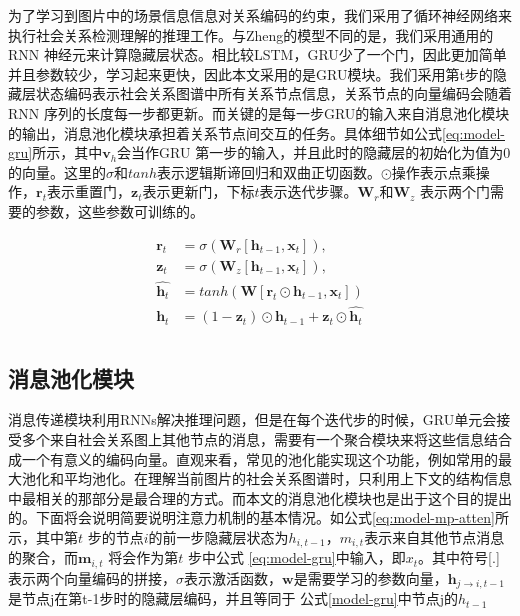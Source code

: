 为了学习到图片中的场景信息信息对关系编码的约束，我们采用了循环神经网络来执行社会关系检测理解的推理工作。与Zheng\cite{zheng2015conditional}的模型不同的是，我们采用通用的RNN 神经元来计算隐藏层状态。相比较LSTM，GRU少了一个门，因此更加简单并且参数较少，学习起来更快，因此本文采用的是GRU模块。我们采用第t步的隐藏层状态编码表示社会关系图谱中所有关系节点信息，关系节点的向量编码会随着RNN 序列的长度每一步都更新。而关键的是每一步GRU的输入来自消息池化模块的输出，消息池化模块承担着关系节点间交互的任务。具体细节如公式\ref{eq:model-gru}所示，其中$\mathbf{v}_h$会当作GRU 第一步的输入，并且此时的隐藏层的初始化为值为0的向量。这里的$\sigma$和$tanh$表示逻辑斯谛回归和双曲正切函数。$\odot$操作表示点乘操作，$\bm{r}_t$表示重置门，$\bm{z}_t$表示更新门，下标$t$表示迭代步骤。$\mathbf{W}_r$和$\mathbf{W}_z$ 表示两个门需要的参数，这些参数可训练的。

\begin{equation} \label{eq:model-gru}
\begin{split}
\bm{r}_t &=  \sigma(\bm{W}_{r}[\bm{h}_{t-1}, \bm{x}_t]), \\
\bm{z}_t &=  \sigma(\bm{W}_{z}[\bm{h}_{t-1}, \bm{x}_t]), \\
\hat{\bm{h}_t} &= tanh(\bm{W}[\bm{r}_t \odot \bm{h}_{t-1}, \bm{x}_{t}])\\
\bm{h}_t &= (1 - \bm{z}_t) \odot \bm{h}_{t - 1} + \bm{z}_t \odot \hat{\bm{h}_t} \\
\end{split}
\end{equation}

\subsection{消息池化模块}

消息传递模块利用RNNs解决推理问题，但是在每个迭代步的时候，GRU单元会接受多个来自社会关系图上其他节点的消息，需要有一个聚合模块来将这些信息结合成一个有意义的编码向量。直观来看，常见的池化能实现这个功能，例如常用的最大池化和平均池化。在理解当前图片的社会关系图谱时，只利用上下文的结构信息中最相关的那部分是最合理的方式。而本文的消息池化模块也是出于这个目的提出的。下面将会说明简要说明注意力机制的基本情况。如公式\ref{eq:model-mp-atten}所示，其中第$t$ 步的节点$i$的前一步隐藏层状态为$h_{i,t-1}$，$m_{i,t}$表示来自其他节点消息的聚合，而$\bm{m}_{i,t}$ 将会作为第$t$ 步中公式
\ref{eq:model-gru}中输入，即$x_{t}$。其中符号[.]表示两个向量编码的拼接，$\sigma$表示激活函数，$\bm{w}$是需要学习的参数向量，$\bm{h}_{j \to i,t-1}$是节点j在第t-1步时的隐藏层编码，并且等同于
公式\ref{model-gru}中节点j的$h_{t-1}$

